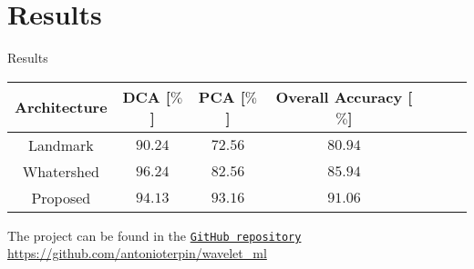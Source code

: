 \section{Results}
    \begin{frame}{Results}
        \begin{center}
            \begin{tabular}{ |c|c|c|c|c|c|c| } 
             \hline
             Architecture & DCA [$\%$] & PCA [$\%$] & Overall Accuracy [$\%$]\\\hline
             Landmark & $90.24$ & $72.56$ & $80.94$\\ 
             Whatershed & $96.24$ & $82.56$ & $85.94$\\ 
             Proposed & $94.13$ & $93.16$ & $91.06$\\
             \hline
            \end{tabular}
            \vskip 1.5cm
            The project can be found in the \href{https://github.com/antonioterpin/wavelet_ml}{\texttt{GitHub repository}}
            \vskip 0.5cm
            \url{https://github.com/antonioterpin/wavelet_ml}
        \end{center}
    \end{frame}